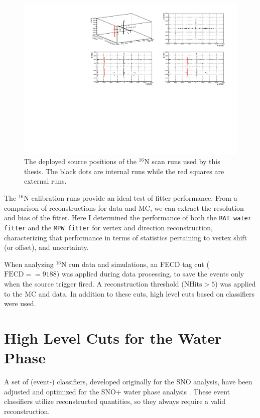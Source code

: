 \begin{figure}[!htb]
	\centering
	\includegraphics[width=15cm]{N16_3Dscan.pdf}
	\caption[The deployed source positions of the $^{16}$N scan runs.]{The deployed source positions of the $^{16}$N scan runs used by this thesis. The black dots are internal runs while the red squares are external runs.\label{N16_3Dscan}}
\end{figure}

The $^{16}$N calibration runs provide an ideal test of fitter performance. From a comparison of reconstructions for data and MC, we can extract the resolution and bias of the fitter. Here I determined the performance of both the \texttt{RAT water fitter} and the \texttt{MPW fitter} for vertex and direction reconstruction, characterizing that performance in terms of statistics pertaining to vertex shift (or offset), and uncertainty. 

When analyzing $^{16}$N run data and simulations, an FECD tag cut ($\mathrm{FECD}==9188$) was applied during data processing, to save the events only when the source trigger fired. A reconstruction threshold ($\mathrm{NHits}>5$) was applied to the MC and data. In addition to these cuts, high level cuts based on classifiers were used. 

\section{High Level Cuts for the Water Phase}\label{sect:high_level_cuts}

A set of (event-) classifiers, developed originally for the SNO analysis, have been adjusted and optimized for the SNO+ water phase analysis \cite{highlevel}. These event classifiers utilize reconstructed quantities, so they always require a valid reconstruction.

